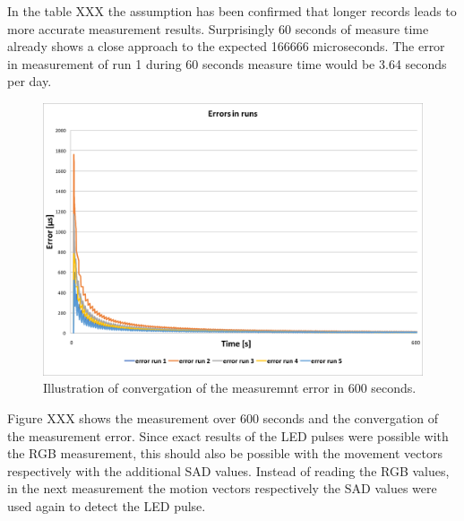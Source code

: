 \documentclass[12pt, a4paper]{report}
\begin{document}
    In the table XXX the assumption has been confirmed that longer records leads to more accurate measurement results.
    Surprisingly 60 seconds of measure time already shows a close approach to the expected 166666 microseconds. The error in measurement of run 1 during 60 seconds measure time would be 3.64 seconds per day.

    \begin{figure}[H]
      \includegraphics[scale=0.5]{Images/errors_600sec.png}
  
    \caption{Illustration of convergation of the measuremnt error in 600 seconds.}
    \end{figure}

    Figure XXX shows the measurement over 600 seconds and the convergation of the measurement error.
    Since exact results of the LED pulses were possible with the RGB measurement, this should also be possible with the movement vectors respectively with the additional SAD values.
    Instead of reading the RGB values, in the next measurement the motion vectors respectively the SAD values were used again to detect the LED pulse.
\end{document}
